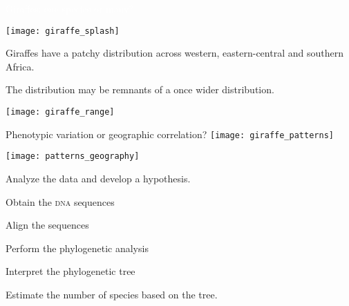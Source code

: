 \documentclass[t]{beamer}
\begin{document}
{
\begin{frame}[t]{\textcolor{white}{\Huge Giraffes: one species or many?}}

\vfilll

\texttt{[image: giraffe\_splash]}	
\end{frame}
}

\begin{frame}[t,plain]
\begin{multicols}{2}

Giraffes have a patchy distribution across western, eastern-central and southern Africa.

\medskip

The distribution may be remnants of a once wider distribution.

\bigskip


\columnbreak

\texttt{[image: giraffe\_range]}
\end{multicols}

\end{frame}


\begin{frame}[t, plain]{Phenotypic variation or geographic correlation?}
\centering
\texttt{[image: giraffe\_patterns]}
\end{frame}

\begin{frame}[t]

\hfill\texttt{[image: patterns\_geography]}

	
\end{frame}

\begin{frame}[t]{Analyze the data and develop a hypothesis.}

\hangpara Obtain the \textsc{dna} sequences

\hangpara Align the sequences

\hangpara Perform the phylogenetic analysis

\hangpara Interpret the phylogenetic tree

\hangpara Estimate the number of species based on the tree.

\end{frame}
\end{document}
